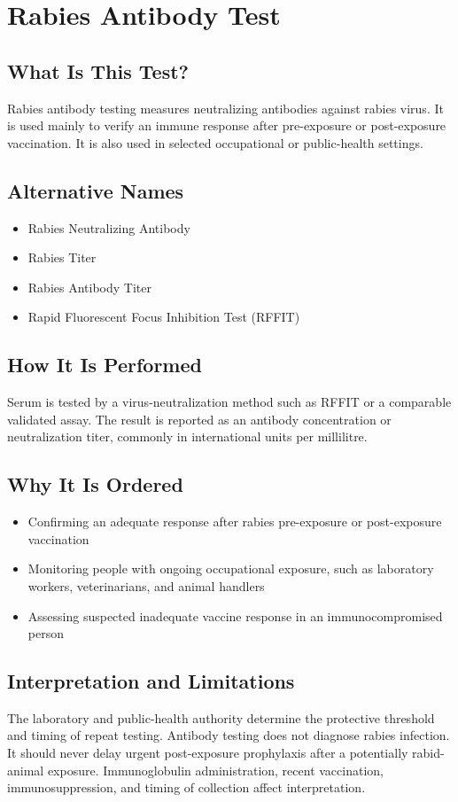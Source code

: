 \chapter{Rabies Antibody Test}

\section*{What Is This Test?}
Rabies antibody testing measures neutralizing antibodies against rabies virus. It is used mainly to verify an immune response after pre-exposure or post-exposure vaccination. It is also used in selected occupational or public-health settings.

\section*{Alternative Names}
\begin{itemize}
  \item Rabies Neutralizing Antibody
  \item Rabies Titer
  \item Rabies Antibody Titer
  \item Rapid Fluorescent Focus Inhibition Test (RFFIT)
\end{itemize}
\section*{How It Is Performed}
Serum is tested by a virus-neutralization method such as RFFIT or a comparable validated assay. The result is reported as an antibody concentration or neutralization titer, commonly in international units per millilitre.

\section*{Why It Is Ordered}
\begin{itemize}
  \item Confirming an adequate response after rabies pre-exposure or post-exposure vaccination
  \item Monitoring people with ongoing occupational exposure, such as laboratory workers, veterinarians, and animal handlers
  \item Assessing suspected inadequate vaccine response in an immunocompromised person
\end{itemize}

\section*{Interpretation and Limitations}
The laboratory and public-health authority determine the protective threshold and timing of repeat testing. Antibody testing does not diagnose rabies infection. It should never delay urgent post-exposure prophylaxis after a potentially rabid-animal exposure. Immunoglobulin administration, recent vaccination, immunosuppression, and timing of collection affect interpretation.
